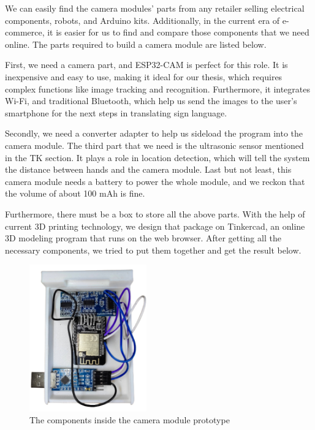 We can easily find the camera modules' parts from any retailer selling electrical components, robots, and Arduino kits. Additionally, in the current era of e-commerce, it is easier for us to find and compare those components that we need online. The parts required to build a camera module are listed below.

First, we need a camera part, and ESP32-CAM is perfect for this role. It is inexpensive and easy to use, making it ideal for our thesis, which requires complex functions like image tracking and recognition. Furthermore, it integrates Wi-Fi, and traditional Bluetooth, which help us send the images to the user's smartphone for the next steps in translating sign language.

Secondly, we need a converter adapter to help us sideload the program into the camera module. The third part that we need is the ultrasonic sensor mentioned in the TK section. It plays a role in location detection, which will tell the system the distance between hands and the camera module. Last but not least, this camera module needs a battery to power the whole module, and we reckon that the volume of about 100 mAh is fine.

Furthermore, there must be a box to store all the above parts. With the help of current 3D printing technology, we design that package on Tinkercad, an online 3D modeling program that runs on the web browser. After getting all the necessary components, we tried to put them together and get the result below.

\begin{figure}[H]
	\centering
	\includegraphics[width=0.45\textwidth]{img/Chap5/Prototype_View_inside.png}
	\caption{The components inside the camera module prototype}
\end{figure}

